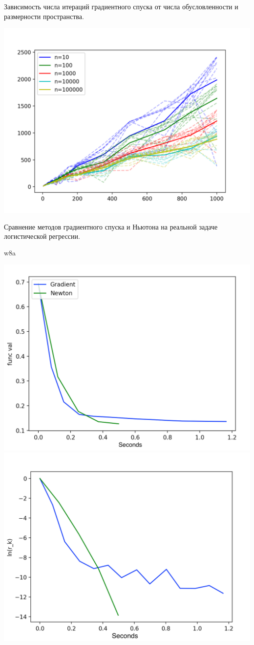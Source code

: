 \documentclass{article}
\theoremstyle{definition}
\theoremstyle{remark}
\begin{document}
Зависимость числа итераций градиентного спуска от числа обусловленности и размерности пространства.

\includegraphics[width=1 \textwidth]{21.png}

Сравнение методов градиентного спуска и Ньютона на реальной задаче логистической регрессии.

w8a

\includegraphics[width=0.6 \textwidth]{31.png}
\includegraphics[width=0.6 \textwidth]{32.png}
\end{document}
